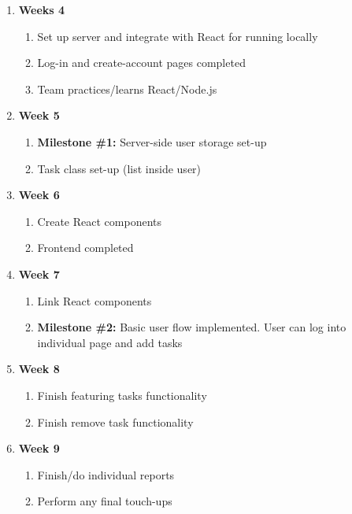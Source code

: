 \documentclass[10pt, letterpaper]{article}
\begin{document}
\begin{enumerate}
	\item \textbf{Weeks 4}
	\begin{enumerate}
		\item Set up server and integrate with React for running locally
		\item Log-in and create-account pages completed
		\item Team practices/learns React/Node.js
	\end{enumerate}
	\item \textbf{Week 5}
	\begin{enumerate}
		\item \textbf{Milestone \#1: }Server-side user storage set-up
		\item Task class set-up (list inside user)
	\end{enumerate}
	\item \textbf{Week 6}
	\begin{enumerate}
		\item Create React components
		\item Frontend completed
	\end{enumerate}
	\item \textbf{Week 7}
	\begin{enumerate}
		\item Link React components
		\item \textbf{Milestone \#2: } Basic user flow implemented. User can log into individual page and add tasks
	\end{enumerate}
	\item \textbf{Week 8}
	\begin{enumerate}
		\item Finish featuring tasks functionality
		\item Finish remove task functionality
	\end{enumerate}
	\item \textbf{Week 9}
	\begin{enumerate}
		\item Finish/do individual reports
		\item Perform any final touch-ups
	\end{enumerate}

	
	
\end{enumerate}
\end{document}
